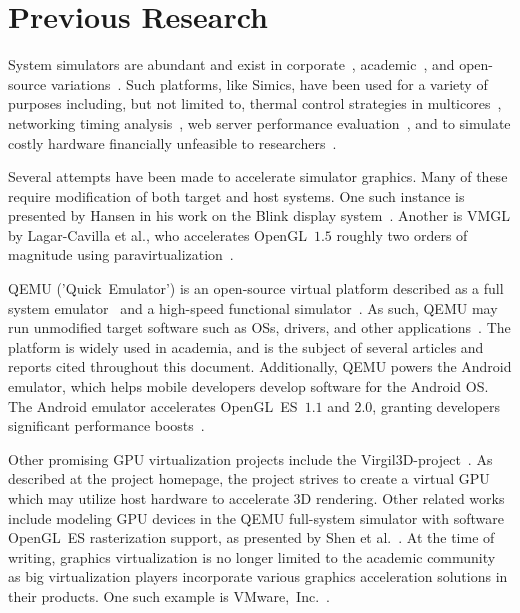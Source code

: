 
\section{Previous Research}
\label{sec:previousresearch}
System simulators are abundant and exist in corporate~, academic~, and open-source variations~.
Such platforms, like Simics, have been used for a variety of purposes including, but not limited to, thermal control strategies in multicores~, networking timing analysis~, web server performance evaluation~, and to simulate costly hardware financially unfeasible to researchers~.

Several attempts have been made to accelerate simulator graphics. Many of these require modification of both target and host systems.
One such instance is presented by Hansen in his work on the Blink display system~.
Another is VMGL by Lagar-Cavilla et al., who accelerates OpenGL~$1.5$ roughly two orders of magnitude using paravirtualization~.

QEMU ('Quick~Emulator') is an open-source virtual platform described as a full system emulator~ and a high-speed functional simulator~.
As such, QEMU may run unmodified target software such as OSs, drivers, and other applications~.
The platform is widely used in academia, and is the subject of several articles and reports cited throughout this document.
Additionally, QEMU powers the Android emulator, which helps mobile developers develop software for the Android OS.
The Android emulator accelerates OpenGL~ES~$1.1$ and $2.0$, granting developers significant performance boosts~.

Other promising GPU virtualization projects include the Virgil3D-project~.
As described at the project homepage, the project strives to create a virtual GPU which may utilize host hardware to accelerate 3D rendering.
Other related works include modeling GPU devices in the QEMU full-system simulator with software OpenGL~ES rasterization support, as presented by Shen et al.~.
At the time of writing, graphics virtualization is no longer limited to the academic community as big virtualization players incorporate various graphics acceleration solutions in their products.
One such example is VMware,~Inc.~.

